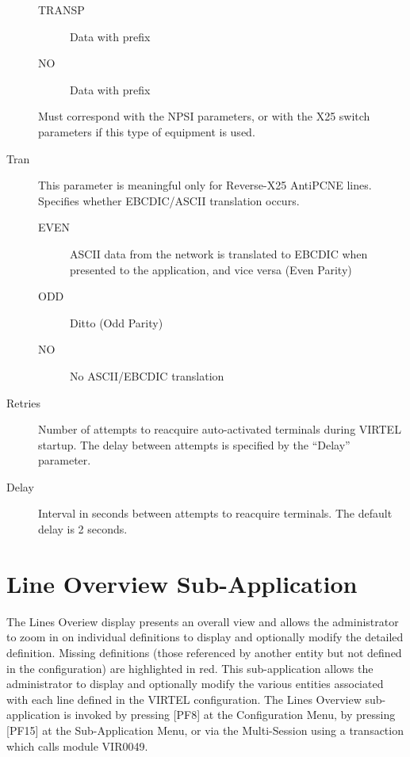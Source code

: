 \documentclass[letterpaper,10pt,english]{sphinxmanual}
\begin{document}
\begin{description}
\begin{description}
\item[{TRANSP}] \leavevmode
Data with prefix

\item[{NO}] \leavevmode
Data with prefix

\end{description}

Must correspond with the NPSI parameters, or with the X25 switch
parameters if this type of equipment is used.

\item[{Tran}] \leavevmode
This parameter is meaningful only for Reverse-X25 AntiPCNE lines.
Specifies whether EBCDIC/ASCII translation occurs.
\begin{description}
\item[{EVEN}] \leavevmode
ASCII data from the network is translated to EBCDIC when presented
to the application, and vice versa (Even Parity)

\item[{ODD}] \leavevmode
Ditto (Odd Parity)

\item[{NO}] \leavevmode
No ASCII/EBCDIC translation

\end{description}

\item[{Retries}] \leavevmode
Number of attempts to reacquire auto-activated terminals during
VIRTEL startup. The delay between attempts is specified by the
“Delay” parameter.

\item[{Delay}] \leavevmode
Interval in seconds between attempts to reacquire terminals. The
default delay is 2 seconds.

\end{description}

\newpage


\section{Line Overview Sub-Application}
\label{\detokenize{connectivity_guide:index-9}}\label{\detokenize{connectivity_guide:line-overview-sub-application}}
The Lines Overiew display presents an overall view and allows the administrator to zoom in on individual definitions to display and optionally modify the detailed definition. Missing definitions (those referenced by another entity but not defined in the configuration) are highlighted in red. This sub-application allows the administrator to display and optionally modify the various entities associated with each line defined in the VIRTEL configuration. The Lines Overview sub-application is invoked by pressing {[}PF8{]} at the Configuration Menu, by pressing {[}PF15{]} at the Sub-Application Menu, or via the Multi-Session using a transaction which calls module VIR0049.
\end{document}

